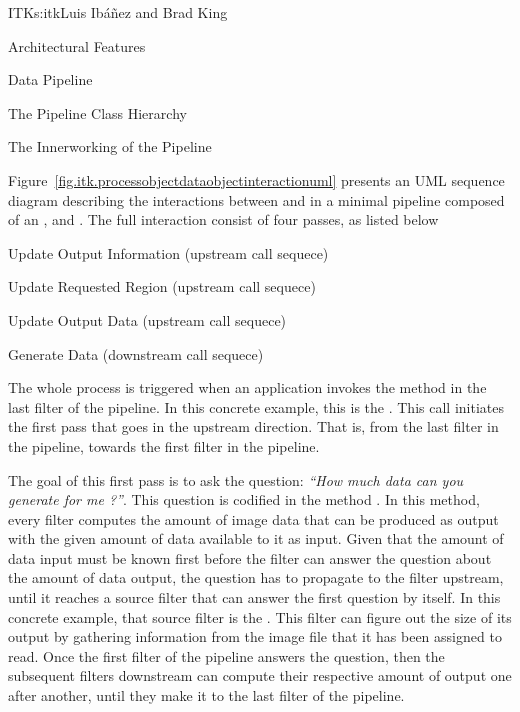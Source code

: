 \begin{aosachapter}{ITK}{s:itk}{Luis Ib\'{a}\~{n}ez and Brad King}
\begin{aosasect1}{Architectural Features}
\begin{aosasect2}{Data Pipeline}
\begin{aosasect3}{The Pipeline Class Hierarchy}
\end{aosasect3}


\begin{aosasect3}{The Innerworking of the Pipeline}


Figure~\ref{fig.itk.processobjectdataobjectinteractionuml} presents an UML
sequence diagram describing the interactions between  and
 in a minimal pipeline composed of an ,
 and . The full interaction
consist of four passes, as listed below

\begin{aosaitemize}
\item Update Output Information (upstream call sequece)
\item Update Requested Region (upstream call sequece)
\item Update Output Data (upstream call sequece)
\item Generate Data (downstream call sequece)
\end{aosaitemize}

The whole process is triggered when an application invokes the 
method in the last filter of the pipeline. In this concrete example, this is
the . This  call initiates the first pass
that goes in the upstream direction. That is, from the last filter in the
pipeline, towards the first filter in the pipeline.

The goal of this first pass is to ask the question: \emph{``How much data can
you generate for me ?''}. This question is codified in the method
. In this method, every filter computes the
amount of image data that can be produced as output with the given amount of
data available to it as input. Given that the amount of data input must be
known first before the filter can answer the question about the amount of data
output, the question has to propagate to the filter upstream, until it reaches
a source filter that can answer the first question by itself. In this concrete
example, that source filter is the . This filter can
figure out the size of its output by gathering information from the image file
that it has been assigned to read. Once the first filter of the pipeline
answers the question, then the subsequent filters downstream can compute their
respective amount of output one after another, until they make it to the last
filter of the pipeline.


\end{aosasect3}
\end{aosasect2}
\end{aosasect1}
\end{aosachapter}
